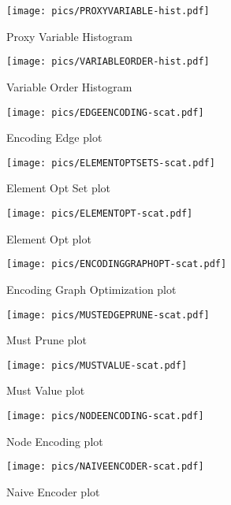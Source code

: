\begin{figure}[htb]
	\centering
	\texttt{[image: pics/PROXYVARIABLE-hist.pdf]}
	\caption{Proxy Variable Histogram}
	\label{fig:proxyvariable}
\end{figure}

\begin{figure}[htb]
	\centering
	\texttt{[image: pics/VARIABLEORDER-hist.pdf]}
	\caption{Variable Order Histogram}
	\label{fig:variableorder}
\end{figure}

\clearpage

\begin{figure}[htb]
	\centering
	\texttt{[image: pics/EDGEENCODING-scat.pdf]}
	\caption{Encoding Edge plot}
	\label{fig:edgeencodings}
\end{figure}


\begin{figure}[htb]
	\centering
	\texttt{[image: pics/ELEMENTOPTSETS-scat.pdf]}
	\caption{Element Opt Set plot}
	\label{fig:elementoptsets}
\end{figure}

\begin{figure}[htb]
	\centering
	\texttt{[image: pics/ELEMENTOPT-scat.pdf]}
	\caption{Element Opt plot}
	\label{fig:elementopts}
\end{figure}

\begin{figure}[htb]
	\centering
	\texttt{[image: pics/ENCODINGGRAPHOPT-scat.pdf]}
	\caption{Encoding Graph Optimization plot}
	\label{fig:encodinggraphs}
\end{figure}

\begin{figure}[htb]
	\centering
	\texttt{[image: pics/MUSTEDGEPRUNE-scat.pdf]}
	\caption{Must Prune plot}
	\label{fig:mustedgeprunes}
\end{figure}

\begin{figure}[htb]
	\centering
	\texttt{[image: pics/MUSTVALUE-scat.pdf]}
	\caption{Must Value plot}
	\label{fig:mustvalues}
\end{figure}

\begin{figure}[htb]
	\centering
	\texttt{[image: pics/NODEENCODING-scat.pdf]}
	\caption{Node Encoding plot}
	\label{fig:nodeencodings}
\end{figure}

\begin{figure}[htb]
	\centering
	\texttt{[image: pics/NAIVEENCODER-scat.pdf]}
	\caption{Naive Encoder plot}
	\label{fig:naiveencoders}
\end{figure}

